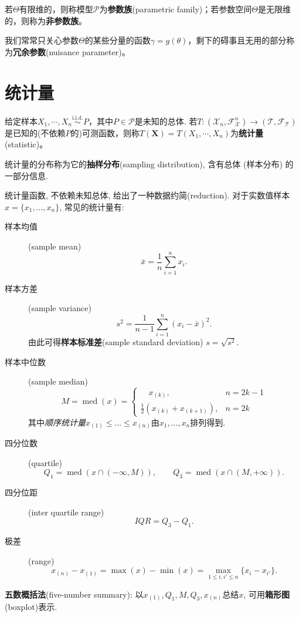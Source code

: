 \begin{definition}
      若$\Theta$有限维的，则称模型$\mathcal{P}$为\textbf{参数族}(parametric family)；若参数空间$\Theta$是无限维的，则称为\textbf{非参数族}。
\end{definition}

我们常常只关心参数$\Theta$的某些分量的函数$\gamma=g(\theta)$，剩下的碍事且无用的部分称为\textbf{冗余参数}(nuisance parameter)。

\section{统计量}

\begin{definition}[统计量]
      给定样本$X_1,\cdots ,X_n \overset{\text{i.i.d.}}{\sim} P$，其中$P \in \mathcal{P}$是未知的总体. 若$ T:(\mathcal{X}_n,\mathscr{F}^n_\mathcal{X})\to (\mathcal{T} ,\mathscr{F}_\mathcal{T})$是已知的(不依赖$P$的)可测函数，则称$T(\mathbf{X})=T(X_1,\cdots ,X_n)$为\textbf{统计量}(statistic)。
\end{definition}

\begin{definition}
      统计量的分布称为它的\textbf{抽样分布}(sampling distribution), 含有总体 (样本分布) 的一部分信息.
\end{definition}

统计量函数, 不依赖未知总体, 给出了一种数据约简(reduction). 对于实数值样本$x = \{x_{1},\dots,x_{n}\}$, 常见的统计量有: \label{descriptive-statistics}
\begin{description}
      \item [样本均值](sample mean)
            \[ \bar{x} = \frac{1}{n}\sum_{i=1}^{n}x_{i}. \]
      \item [样本方差](sample variance)
            \[ s^{2} = \frac{1}{n-1}\sum_{i=1}^{n}(x_{i}-\bar{x})^{2}. \]
            由此可得\textbf{样本标准差}(sample standard deviation) $s = \sqrt{s^2}$.
      \item [样本中位数](sample median)
            \[ M = \operatorname{med}(x) = \begin{cases}
                        \quad x_{(k)},                  & n = 2k-1 \\
                        \frac{1}{2}(x_{(k)}+x_{(k+1)}), & n = 2k
                  \end{cases} \]
            其中\emph{顺序统计量}$x_{(1)}\leq\dots\leq x_{(n)}$由$x_{1},\dots,x_{n}$排列得到.
      \item [四分位数](quartile)
            \[ Q_{1} = \operatorname{med}(x\cap(-\infty,M)), \qquad
                  Q_{3} = \operatorname{med}(x\cap(M,+\infty)). \]
      \item [四分位距](inter quartile range)
            \[ \mathit{IQR} = Q_{3} - Q_{1}. \]
      \item [极差](range)
            \[ x_{(n)}-x_{(1)} = \max(x)-\min(x) = \max_{1\leq i,i' \leq n}\{x_{i}-x_{i'}\}. \]
\end{description}

\begin{definition}
      \textbf{五数概括法}(five-number summary): 以$x_{(1)},Q_{1},M,Q_{3},x_{(n)}$总结$x$, 可用\textbf{箱形图}(boxplot)表示.
\end{definition}
